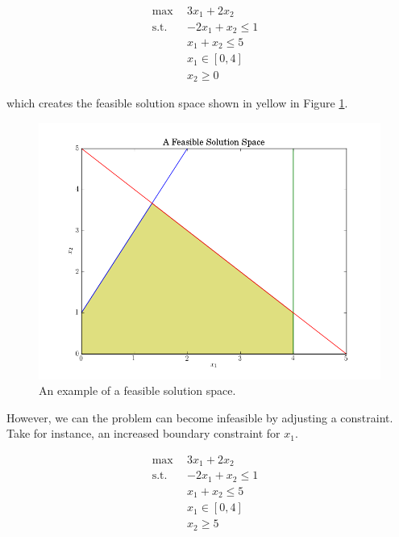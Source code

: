 \begin{subequations}\label{eqs:feas}
  \begin{align}
    \max \:\: & 
    3 x_1 + 2 x_2
    & \label{eqs:feas_obj} \\
    \text{s.t.} \:\: &
    -2 x_1 + x_2 \leq 1 \\
    &
    x_1 + x_2 \leq 5 
    & \label{eqs:feas_sup} \\
    &
    x_1 \in [0, 4]
    &\label{eqs:feas_x1} \\
    &
    x_2 \geq 0
    &\label{eqs:feas_x2}
  \end{align}
\end{subequations}

which creates the feasible solution space shown in yellow in
Figure \ref{fig:feasible}.

\begin{figure}[H]
  \begin{center}
    \includegraphics[width=\linewidth]{./chapters/litreview/plots/feasible.png}
  \caption{An example of a feasible solution space.}
  \label{fig:feasible}
  \end{center}
\end{figure}

However, we can the problem can become infeasible by adjusting a
constraint. Take for instance, an increased boundary constraint for $x_1$.

\begin{subequations}\label{eqs:infeas}
  \begin{align}
    \max \:\: & 
    3 x_1 + 2 x_2
    & \label{eqs:infeas_obj} \\
    \text{s.t.} \:\: &
    -2 x_1 + x_2 \leq 1 \\
    &
    x_1 + x_2 \leq 5 
    & \label{eqs:infeas_sup} \\
    &
    x_1 \in [0, 4]
    &\label{eqs:infeas_x1} \\
    &
    x_2 \geq 5
    &\label{eqs:infeas_x2}
  \end{align}
\end{subequations}

